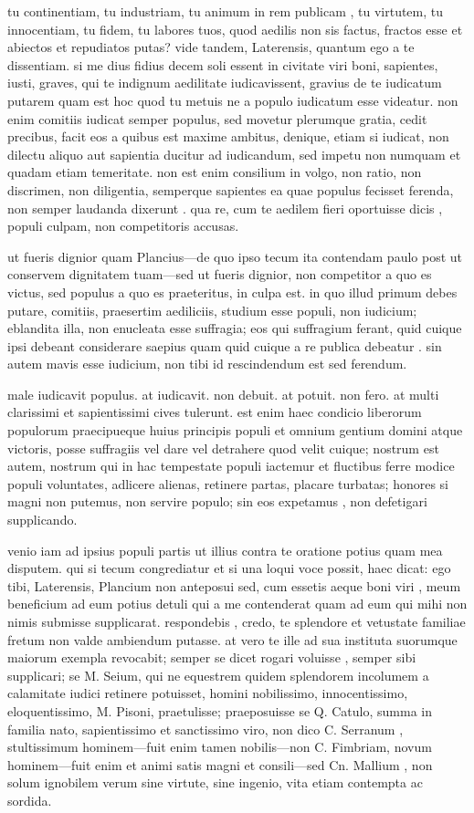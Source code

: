  tu continentiam, tu industriam, tu animum in rem publicam , tu virtutem, tu innocentiam, tu fidem, tu labores tuos, quod aedilis non sis factus, fractos esse et abiectos et repudiatos putas? vide tandem, Laterensis, quantum ego a te dissentiam. si me dius fidius decem soli essent in civitate viri boni, sapientes, iusti, graves, qui te indignum aedilitate iudicavissent, gravius de te iudicatum putarem quam est hoc quod tu metuis ne a populo iudicatum esse videatur. non enim comitiis iudicat semper populus, sed movetur plerumque gratia, cedit precibus, facit eos a quibus est maxime ambitus, denique, etiam si iudicat, non dilectu aliquo aut sapientia ducitur ad iudicandum, sed impetu non numquam et quadam etiam temeritate. non est enim consilium in volgo, non ratio, non discrimen, non diligentia, semperque sapientes ea quae populus fecisset ferenda, non semper laudanda dixerunt . qua re, cum te aedilem fieri oportuisse dicis , populi culpam, non competitoris accusas.

 ut fueris dignior quam Plancius—de quo ipso tecum ita contendam paulo post ut conservem dignitatem tuam—sed ut fueris dignior, non competitor a quo es victus, sed populus a quo es praeteritus, in culpa est. in quo illud primum debes putare, comitiis, praesertim aediliciis, studium esse populi, non iudicium; eblandita illa, non enucleata esse suffragia; eos qui suffragium ferant, quid cuique ipsi debeant considerare saepius quam quid cuique a re publica debeatur . sin autem mavis esse iudicium, non tibi id rescindendum est sed ferendum.

 male iudicavit populus. at iudicavit. non debuit. at potuit. non fero. at multi clarissimi et sapientissimi cives tulerunt. est enim haec condicio liberorum populorum praecipueque huius principis populi et omnium gentium domini atque victoris, posse suffragiis vel dare vel detrahere quod velit cuique; nostrum est autem, nostrum qui in hac tempestate populi iactemur et fluctibus ferre modice populi voluntates, adlicere alienas, retinere partas, placare turbatas; honores si magni non putemus, non servire populo; sin eos expetamus , non defetigari supplicando.

 venio iam ad ipsius populi partis ut illius contra te oratione potius quam mea disputem. qui si tecum congrediatur et si una loqui voce possit, haec dicat: ego tibi, Laterensis, Plancium non anteposui sed, cum essetis aeque boni viri , meum beneficium ad eum potius detuli qui a me contenderat quam ad eum qui mihi non nimis submisse supplicarat. respondebis , credo, te splendore et vetustate familiae fretum non valde ambiendum putasse. at vero te ille ad sua instituta suorumque maiorum exempla revocabit; semper se dicet rogari voluisse , semper sibi supplicari; se M. Seium, qui ne equestrem quidem splendorem incolumem a calamitate iudici retinere potuisset, homini nobilissimo, innocentissimo, eloquentissimo, M. Pisoni, praetulisse; praeposuisse se Q. Catulo, summa in familia nato, sapientissimo et sanctissimo viro, non dico C. Serranum , stultissimum hominem—fuit enim tamen nobilis—non C. Fimbriam, novum hominem—fuit enim et animi satis magni et consili—sed Cn. Mallium , non solum ignobilem verum sine virtute, sine ingenio, vita etiam contempta ac sordida.

